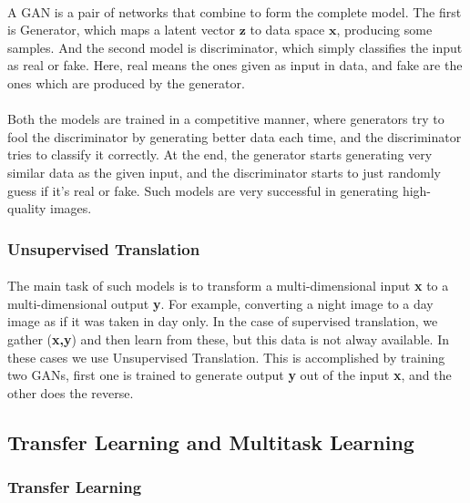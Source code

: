 \documentclass{article}
\begin{document}
              \paragraph{} A GAN is a pair of networks that combine to form the complete model. The first is Generator, which maps a latent vector $\mathbf{z}$ to data space $\mathbf{x}$, producing some samples. And the second model is discriminator, which simply classifies the input as real or fake. Here, real means the ones given as input in data, and fake are the ones which are produced by the generator.
              \paragraph{} Both the models are trained in a competitive manner, where generators try to fool the discriminator by generating better data each time, and the discriminator tries to classify it correctly. At the end, the generator starts generating very similar data as the given input, and the discriminator starts to just randomly guess if it's real or fake. Such models are very successful in generating high-quality images.

    \subsubsection{Unsupervised Translation}
              \paragraph{} The main task of such models is to transform a multi-dimensional input \textbf{x} to a multi-dimensional output \textbf{y}. For example, converting a night image to a day image as if it was taken in day only. In the case of supervised translation, we gather (\textbf{x,y}) and then learn from these, but this data is not alway available. In these cases we use Unsupervised Translation. This is accomplished by training two GANs, first one is trained to generate output \textbf{y} out of the input \textbf{x}, and the other does the reverse.

  \subsection{Transfer Learning and Multitask Learning}
    \subsubsection{Transfer Learning}
\end{document}
